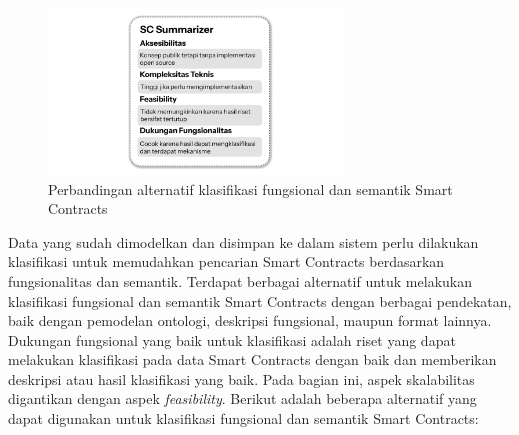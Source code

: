 \begin{figure}[ht]
	\centering
	\includegraphics[width=0.7\textwidth]{resources/chapter-3/klasifikasi - 4.png}
	\caption{Perbandingan alternatif klasifikasi fungsional dan semantik Smart Contracts}
    \label{image:klasifikasi-4}
\end{figure}

Data yang sudah dimodelkan dan disimpan ke dalam sistem perlu dilakukan klasifikasi untuk memudahkan pencarian Smart Contracts berdasarkan fungsionalitas dan semantik. Terdapat berbagai alternatif untuk melakukan klasifikasi fungsional dan semantik Smart Contracts dengan berbagai pendekatan, baik dengan pemodelan ontologi, deskripsi fungsional, maupun format lainnya. Dukungan fungsional yang baik untuk klasifikasi adalah riset yang dapat melakukan klasifikasi pada data Smart Contracts dengan baik dan memberikan deskripsi atau hasil klasifikasi yang baik. Pada bagian ini, aspek skalabilitas digantikan dengan aspek \textit{feasibility}. Berikut adalah beberapa alternatif yang dapat digunakan untuk klasifikasi fungsional dan semantik Smart Contracts:

